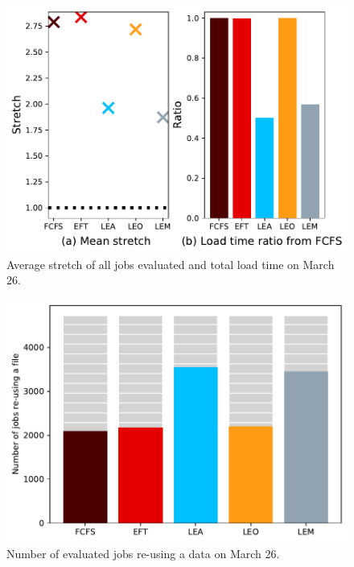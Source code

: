 \documentclass[conference,10pt]{IEEEtran}
\begin{document}
\begin{figure}[t]\centering\includegraphics[width=1\linewidth]{../MBSS/plot/Results_FCFS_Score_Backfill_2022-03-26->2022-03-26_V10000_Mean_Stretch_Total_waiting_for_a_load_time_and_transfer_time_450_128_32_256_4_1024.pdf}\caption{Average stretch of all jobs evaluated and total load time on March 26.}
\label{stretch.03-26}\end{figure}
\begin{figure}[t]\centering\includegraphics[width=1\linewidth]{../MBSS/plot/Results_FCFS_Score_Backfill_2022-03-26->2022-03-26_V10000_Number_of_data_reuse_450_128_32_256_4_1024.pdf}\caption{Number of evaluated jobs re-using a data on March 26.}\label{reuse.03-26}\end{figure}
\end{document}
